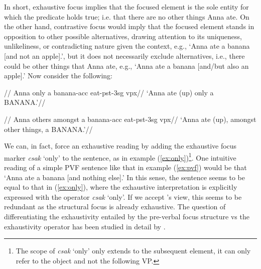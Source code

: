 \documentclass[a4paper, ruler]{CUP-JNL-LIN}%
\begin{document}


In short, exhaustive focus implies that the focused element is the sole entity for which the predicate holds true; i.e. that there are no other things Anna ate. On the other hand, contrastive focus would imply that the focused element stands in opposition to other possible alternatives, drawing attention to its uniqueness, unlikeliness, or contradicting nature given the context, e.g., `Anna ate a banana [and not an apple].', but it does not necessarily exclude alternatives, i.e., there could be other things that Anna ate, e.g., `Anna ate a banana [and/but also an apple].' Now consider the following:



\pex[everygla={},aboveglftskip=0em,interpartskip=0pt]
\begingl \label{ex:only}
//
\glb Anna{\sc [nom]} only a banana-{\sc acc} eat-{\sc pst-3sg} {\sc vpx}//
\glft `Anna ate (up) only a BANANA.'//
\endgl
\xe

\vspace{-12px}

\pex[everygla={},aboveglftskip=0em,interpartskip=0pt]
\begingl \label{ex:amongst_others}
//
\glb Anna{\sc [nom]} {others amongst} a banana-{\sc acc} eat-{\sc pst-3sg} {\sc vpx}//
\glft `Anna ate (up), amongst other things, a BANANA.'//
\endgl
\xe



We can, in fact, force an exhaustive reading by adding the exhaustive focus marker \textit{csak} `only' to the sentence, as in example (\ref{ex:only})\footnote{The scope of \textit{csak} `only' only extends to the subsequent element, it can only refer to the object and not the following VP.}. One intuitive reading of a simple PVF sentence like that in example (\ref{ex:pvf}) would be that `Anna ate a banana [and nothing else].' In this sense, the sentence seems to be equal to that in (\ref{ex:only}), where the exhaustive interpretation is explicitly expressed with the operator \textit{csak} `only'. If we accept \citet{ekiss_1998_identificational}'s view, this seems to be redundant as the structural focus is already exhaustive. The question of differentiating the exhaustivity entailed by the pre-verbal focus structure vs the exhaustivity operator has been studied in detail by \citet{balogh_2007_focus}. 
\end{document}
